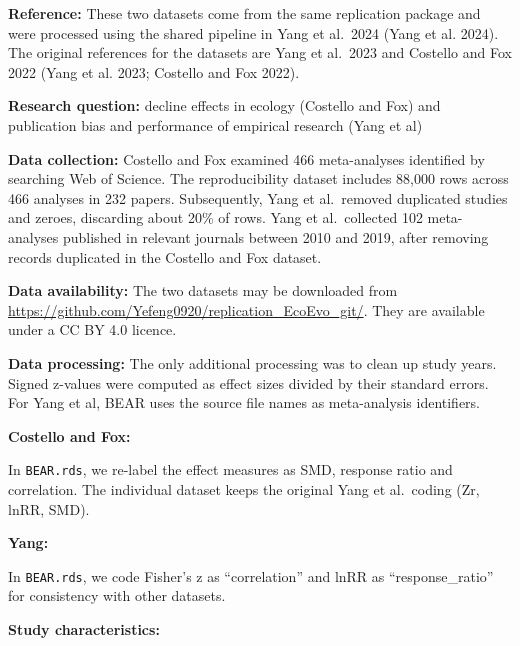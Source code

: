 \documentclass[
  11pt,
]{article}
\begin{document}
\textbf{Reference:} These two datasets come from the same replication
package and were processed using the shared pipeline in Yang et al.~2024
(Yang et al. 2024). The original references for the datasets are Yang et
al.~2023 and Costello and Fox 2022 (Yang et al. 2023; Costello and Fox
2022).

\textbf{Research question:} decline effects in ecology (Costello and
Fox) and publication bias and performance of empirical research (Yang et
al)

\textbf{Data collection:} Costello and Fox examined 466 meta-analyses
identified by searching Web of Science. The reproducibility dataset
includes 88,000 rows across 466 analyses in 232 papers. Subsequently,
Yang et al.~removed duplicated studies and zeroes, discarding about 20\%
of rows. Yang et al.~collected 102 meta-analyses published in relevant
journals between 2010 and 2019, after removing records duplicated in the
Costello and Fox dataset.

\textbf{Data availability:} The two datasets may be downloaded from
\url{https://github.com/Yefeng0920/replication_EcoEvo_git/}. They are
available under a CC BY 4.0 licence.

\textbf{Data processing:} The only additional processing was to clean up
study years. Signed z-values were computed as effect sizes divided by
their standard errors. For Yang et al, BEAR uses the source file names
as meta-analysis identifiers.

\textbf{Costello and Fox:}

In \texttt{BEAR.rds}, we re-label the effect measures as SMD, response
ratio and correlation. The individual dataset keeps the original Yang et
al.~coding (Zr, lnRR, SMD).

\textbf{Yang:}

In \texttt{BEAR.rds}, we code Fisher's z as ``correlation'' and lnRR as
``response\_ratio'' for consistency with other datasets.

\textbf{Study characteristics:}
\end{document}
